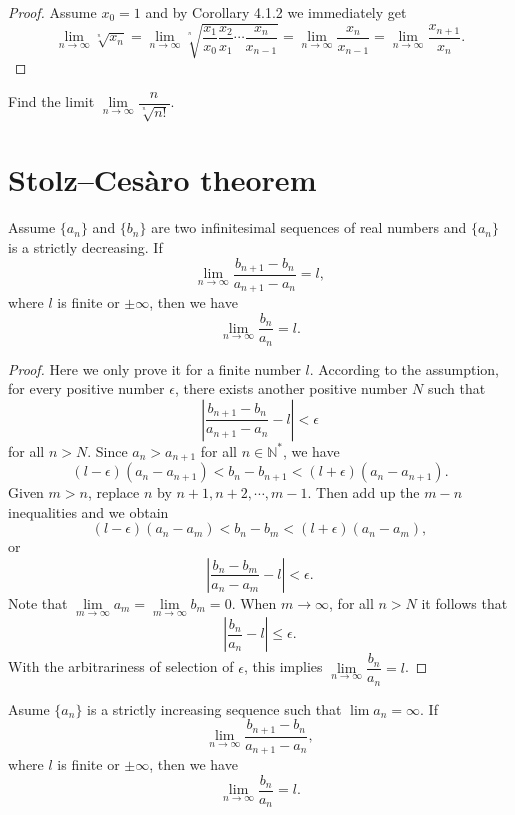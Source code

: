 \documentclass[11pt,fleqn]{book} %
\begin{document}
\begin{proof}
    Assume $x_0=1$ and by Corollary 4.1.2 we immediately get
	\[
	\lim\limits_{n\to\infty}\sqrt[^n]{x_n}=\lim\limits_{n\to\infty}\sqrt[^n]{\frac{x_1}{x_0}\frac{x_2}{x_1}\cdots\frac{x_{n}}{x_{n-1}}}=\lim\limits_{n\to\infty}\frac{x_n}{x_{n-1}}=\lim\limits_{n\to\infty}\frac{x_{n+1}}{x_n}.
	\]
\end{proof}

\begin{example}
	Find the limit $\lim\limits_{n\to\infty}\dfrac{n}{\sqrt[^n]{n!}}$.
\end{example}

\section{Stolz–Cesàro theorem}

\begin{theorem}
	Assume $\{a_n\}$ and $\{b_n\}$ are two infinitesimal sequences of real numbers and $\{a_n\}$ is a strictly decreasing. If
	\[
		\lim\limits_{n\to\infty}\frac{b_{n+1}-b_n}{a_{n+1}-a_n}=l,
	\]
    where $l$ is finite or $\pm\infty$, then we have
	\[
	    \lim\limits_{n\to\infty}\frac{b_n}{a_n}=l.
	\]
\end{theorem}

\begin{proof}
	Here we only prove it for a finite number $l$. According to the assumption, for every positive number $\epsilon$, there exists another positive number $N$ such that
	\[
	\left|\frac{b_{n+1}-b_n}{a_{n+1}-a_n}-l\right|<\epsilon
	\]
	for all $n>N$. Since $a_n>a_{n+1}$ for all $n\in\mathbb{N^*}$, we have
	\[
	(l-\epsilon)(a_n-a_{n+1})<b_n-b_{n+1}<(l+\epsilon)(a_n-a_{n+1}).
	\]
	Given $m>n$, replace $n$ by $n+1,n+2,\cdots,m-1$. Then add up the $m-n$ inequalities and we obtain
	\[
	(l-\epsilon)(a_n-a_m)<b_n-b_m<(l+\epsilon)(a_n-a_m),
	\]
	or
	\[
	\left|\frac{b_n-b_m}{a_n-a_m}-l\right|<\epsilon.
	\]
	Note that $\lim\limits_{m\to\infty}a_m=\lim\limits_{m\to\infty}b_m=0$. When $m\to\infty$, for all $n>N$ it follows that
	\[
	\left|\frac{b_n}{a_n}-l\right|\leqslant\epsilon.
	\]
	With the arbitrariness of selection of $\epsilon$, this implies $\lim\limits_{n\to\infty}\dfrac{b_n}{a_n}=l$.
\end{proof}

\vspace{3mm}

\begin{theorem}
	Asume $\{a_n\}$ is a strictly increasing sequence such that $\lim a_n = \infty$. If
	\[
	\lim\limits_{n\to\infty}\frac{b_{n+1}-b_n}{a_{n+1}-a_n},
	\]
	where $l$ is finite or $\pm\infty$, then we have
	\[
	\lim\limits_{n\to\infty}\frac{b_n}{a_n}=l.
	\]
\end{theorem}
\end{document}

